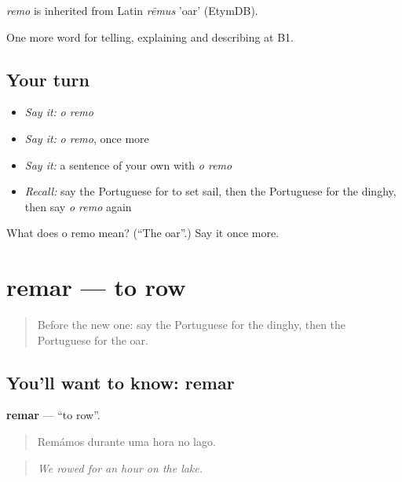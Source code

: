 \begin{cousinweb}
\emph{remo} is inherited from Latin \emph{rēmus} 'oar' (EtymDB).
\end{cousinweb}

\begin{grammarlens}[title={What you've built}]
One more word for telling, explaining and describing at B1.
\end{grammarlens}

\subsection*{Your turn}
\begin{itemize}
\raggedright
  \item \emph{Say it:} \emph{o remo}
  \item \emph{Say it:} \emph{o remo}, once more
  \item \emph{Say it:} a sentence of your own with \emph{o remo}
  \item \emph{Recall:} say the Portuguese for to set sail, then the Portuguese for the dinghy, then say \emph{o remo} again
\end{itemize}

\begin{tcolorbox}[breakable,colback=teal!4,colframe=teal!35!black,title={Before you move on}]
What does o remo mean? (\textquotedblleft{}The oar\textquotedblright{}.) Say it once more.
\end{tcolorbox}
\section[remar]{remar — to row}

\label{lesson:PT-C418-remar}



\begin{quote}
Before the new one: say the Portuguese for the dinghy, then the Portuguese for the oar.
\end{quote}

\subsection*{You'll want to know: remar}
\textbf{remar} — \textquotedblleft{}to row\textquotedblright{}.

\begin{quote}
Remámos durante uma hora no lago.
\end{quote}

\begin{quote}
\emph{We rowed for an hour on the lake.}
\end{quote}


